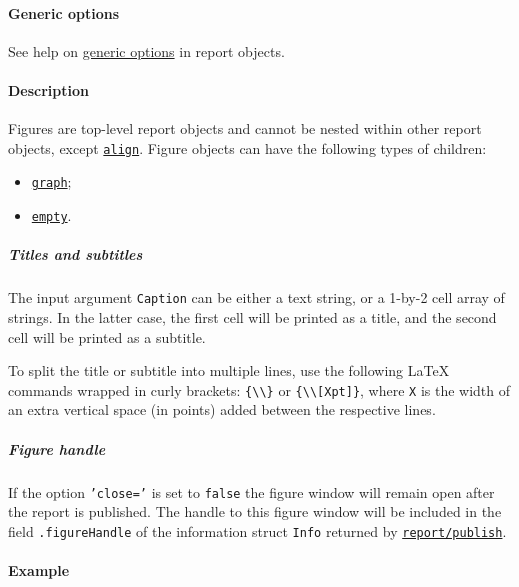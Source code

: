 \paragraph{Generic options}

See help on \href{report/Contents}{generic options} in report objects.

\paragraph{Description}

Figures are top-level report objects and cannot be nested within other
report objects, except \href{report/align}{\texttt{align}}. Figure
objects can have the following types of children:

\begin{itemize}
\itemsep1pt\parskip0pt
\item
  \href{report/graph}{\texttt{graph}};
\item
  \href{report/empty}{\texttt{empty}}.
\end{itemize}

\subparagraph{Titles and subtitles}

The input argument \texttt{Caption} can be either a text string, or a
1-by-2 cell array of strings. In the latter case, the first cell will be
printed as a title, and the second cell will be printed as a subtitle.

To split the title or subtitle into multiple lines, use the following
LaTeX commands wrapped in curly brackets:
\texttt{\{\textbackslash{}\textbackslash{}\}} or
\texttt{\{\textbackslash{}\textbackslash{}{[}Xpt{]}\}}, where \texttt{X}
is the width of an extra vertical space (in points) added between the
respective lines.

\subparagraph{Figure handle}

If the option \texttt{'close='} is set to \texttt{false} the figure
window will remain open after the report is published. The handle to
this figure window will be included in the field \texttt{.figureHandle}
of the information struct \texttt{Info} returned by
\href{report/publish}{\texttt{report/publish}}.

\paragraph{Example}


